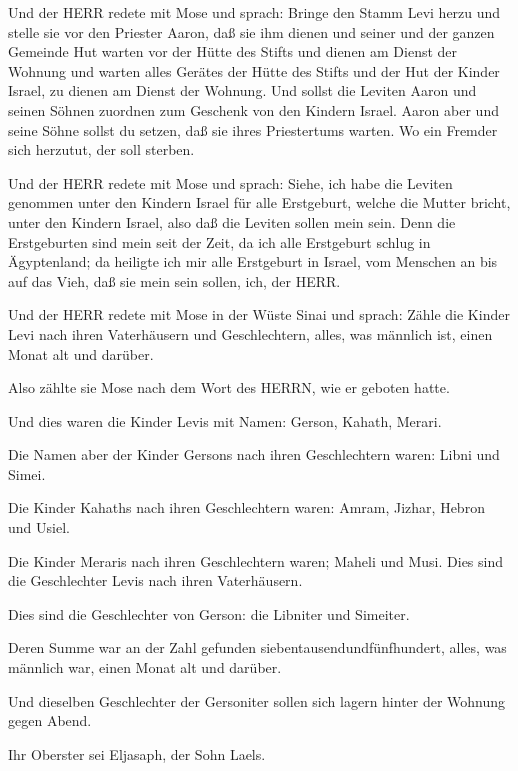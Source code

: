  Und der HERR redete mit Mose und sprach: 
Bringe den Stamm Levi herzu und stelle sie vor den Priester Aaron, daß
sie ihm dienen  und seiner und der ganzen Gemeinde Hut
warten vor der Hütte des Stifts und dienen am Dienst der Wohnung
 und warten alles Gerätes der Hütte des Stifts und der Hut
der Kinder Israel, zu dienen am Dienst der Wohnung.  Und
sollst die Leviten Aaron und seinen Söhnen zuordnen zum Geschenk von den
Kindern Israel.  Aaron aber und seine Söhne sollst du
setzen, daß sie ihres Priestertums warten. Wo ein Fremder sich herzutut,
der soll sterben.

 Und der HERR redete mit Mose und sprach: 
Siehe, ich habe die Leviten genommen unter den Kindern Israel für alle
Erstgeburt, welche die Mutter bricht, unter den Kindern Israel, also daß
die Leviten sollen mein sein.  Denn die Erstgeburten sind
mein seit der Zeit, da ich alle Erstgeburt schlug in Ägyptenland; da
heiligte ich mir alle Erstgeburt in Israel, vom Menschen an bis auf das
Vieh, daß sie mein sein sollen, ich, der HERR.

 Und der HERR redete mit Mose in der Wüste Sinai und
sprach:  Zähle die Kinder Levi nach ihren Vaterhäusern und
Geschlechtern, alles, was männlich ist, einen Monat alt und darüber.

 Also zählte sie Mose nach dem Wort des HERRN, wie er
geboten hatte.

 Und dies waren die Kinder Levis mit Namen: Gerson, Kahath,
Merari.

 Die Namen aber der Kinder Gersons nach ihren Geschlechtern
waren: Libni und Simei.

 Die Kinder Kahaths nach ihren Geschlechtern waren: Amram,
Jizhar, Hebron und Usiel.

 Die Kinder Meraris nach ihren Geschlechtern waren; Maheli
und Musi. Dies sind die Geschlechter Levis nach ihren Vaterhäusern.

 Dies sind die Geschlechter von Gerson: die Libniter und
Simeiter.

 Deren Summe war an der Zahl gefunden
siebentausendundfünfhundert, alles, was männlich war, einen Monat alt
und darüber.

 Und dieselben Geschlechter der Gersoniter sollen sich
lagern hinter der Wohnung gegen Abend.

 Ihr Oberster sei Eljasaph, der Sohn Laels.

